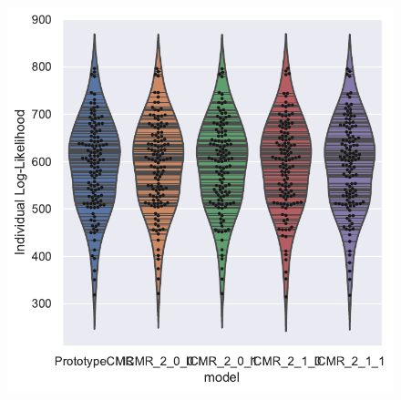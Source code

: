 \documentclass[
  letterpaper,
  DIV=11,
  numbers=noendperiod]{scrreport}
\begin{document}
\begin{figure}

\begin{minipage}[c]{\linewidth}

{\centering 

\includegraphics{./figures/individual_HealyKahana2014.pdf}

}

\end{minipage}%
\newline
\begin{minipage}[c]{\linewidth}

{\centering 

}
\end{minipage}
\end{figure}
\end{document}

